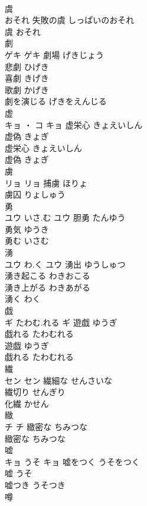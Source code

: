 \documentclass[8pt]{extreport}
\begin{document}
\begin{CJK}{UTF8}{min}
\\	虞	
\\	おそれ		失敗の虞	しっぱいのおそれ	
\\	虞	おそれ	
\\	劇	
\\	ゲキ		ゲキ	劇場	げきじょう	
\\	悲劇	ひげき	
\\	喜劇	きげき	
\\	歌劇	かげき	
\\	劇を演じる	げきをえんじる	
\\	虚	
\\	キョ ・ コ		キョ	虚栄心	きょえいしん	
\\	虚偽	きょぎ	
\\	虚栄心	きょえいしん	
\\	虚偽	きょぎ	
\\	虜	
\\	リョ		リョ	捕虜	ほりょ	
\\	虜囚	りょしゅう	
\\	勇	
\\	ユウ	いさ.む	ユウ	胆勇	たんゆう	
\\	勇気	ゆうき	
\\	勇む	いさむ	
\\	湧	
\\	ユウ	わ.く	ユウ	湧出	ゆうしゅつ	
\\	湧き起こる	わきおこる	
\\	湧き上がる	わきあがる	
\\	湧く	わく	
\\	戯	
\\	ギ	たわむ.れる	ギ	遊戯	ゆうぎ	
\\	戯れる	たわむれる	
\\	遊戯	ゆうぎ	
\\	戯れる	たわむれる	
\\	繊	
\\	セン		セン	繊細な	せんさいな	
\\	繊切り	せんぎり	
\\	化繊	かせん	
\\	緻	
\\	チ		チ	緻密な	ちみつな	
\\	緻密な	ちみつな	
\\	嘘	
\\	キョ	うそ	キョ	嘘をつく	うそをつく	
\\	嘘	うそ	
\\	嘘つき	うそつき	
\\	噂	

\end{CJK}
\end{document}
